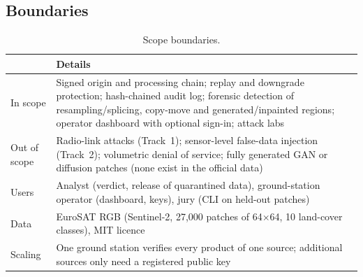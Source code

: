 \subsection{Boundaries}
\begin{table}[!htbp]
\centering\small
\begin{tabularx}{\textwidth}{|L{2.6cm}|Y|}
\hline
 & \textbf{Details}\\
\hline
In scope & Signed origin and processing chain; replay and downgrade protection; hash-chained audit log; forensic detection of resampling/splicing, copy-move and generated/inpainted regions; operator dashboard with optional sign-in; attack labs\\
\hline
Out of scope & Radio-link attacks (Track~1); sensor-level false-data injection (Track~2); volumetric denial of service; fully generated GAN or diffusion patches (none exist in the official data)\\
\hline
Users & Analyst (verdict, release of quarantined data), ground-station operator (dashboard, keys), jury (CLI  on held-out patches)\\
\hline
Data & EuroSAT RGB (Sentinel-2, 27,000 patches of 64$\times$64, 10 land-cover classes), MIT licence\\
\hline
Scaling & One ground station verifies every product of one source; additional sources only need a registered public key\\
\hline
\end{tabularx}
\caption{Scope boundaries.}
\end{table}

